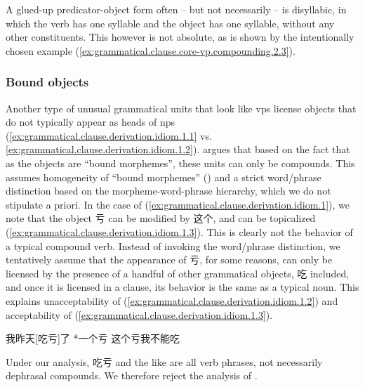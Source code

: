 \documentclass[UTF8, a4paper, oneside, scheme=plain, 12pt]{ctexrep}
\newcommand*{\citepage}[1]{p.~{#1}}
\begin{document}
A glued-up predicator-object form often -- but not necessarily -- is disyllabic,
in which the verb has one syllable and the object has one syllable,
without any other constituents.
This however is not absolute, as is shown by the intentionally chosen example (\ref{ex:grammatical.clause.core-vp.compounding.2.3}).

\subsubsection{Bound objects}\label{sec:grammatical.clause.core-vp.derivation.object-bound}

Another type of unusual grammatical units that look like \acp{vp} 
license objects that do not typically appear as heads of \acp{np}
(\ref{ex:grammatical.clause.derivation.idiom.1.1} vs. \ref{ex:grammatical.clause.derivation.idiom.1.2}).
\citet[\citepage{129}]{zhudexigrammar} argues that based on the fact that 
as the objects are ``bound morphemes'', these units can only be compounds.
This assumes homogeneity of ``bound morphemes'' ()
and a strict word/phrase distinction based on the morpheme-word-phrase hierarchy,
which we do not stipulate a priori.
In the case of (\ref{ex:grammatical.clause.derivation.idiom.1}),
we note that the object 亏 can be modified by 这个,
and can be topicalized (\ref{ex:grammatical.clause.derivation.idiom.1.3}).
This is clearly not the behavior of a typical compound verb.
Instead of invoking the word/phrase distinction,
we tentatively assume that the appearance of 亏,
for some reasons, can only be licensed by the presence of a handful of other grammatical objects,
吃 included, and once it is licensed in a clause,
its behavior is the same as a typical noun.
This explains unacceptability of (\ref{ex:grammatical.clause.derivation.idiom.1.2})
and acceptability of (\ref{ex:grammatical.clause.derivation.idiom.1.3}).

\begin{exe}
    \ex\label{ex:grammatical.clause.derivation.idiom.1} \begin{xlist}
        \ex\label{ex:grammatical.clause.derivation.idiom.1.1} 我昨天[吃亏]了
        \ex\label{ex:grammatical.clause.derivation.idiom.1.2} *一个亏
        \ex\label{ex:grammatical.clause.derivation.idiom.1.3} 这个亏我不能吃
    \end{xlist}
\end{exe}

Under our analysis, 吃亏 and the like are all verb phrases,
not necessarily dephrasal compounds.
We therefore reject the analysis of \citet[\citepage{129}]{zhudexigrammar}.
\end{document}

